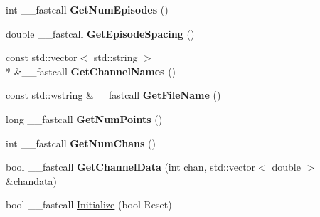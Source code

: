 \begin{DoxyCompactItemize}
\item 
\hypertarget{class_t_playback_waveform_ad7a57b795e3c7b2c9f4f48e43db97c0c}{int \+\_\+\+\_\+fastcall {\bfseries Get\+Num\+Episodes} ()}\label{class_t_playback_waveform_ad7a57b795e3c7b2c9f4f48e43db97c0c}

\item 
\hypertarget{class_t_playback_waveform_ae42334d0a3445961bb4142ee0c5bd1e8}{double \+\_\+\+\_\+fastcall {\bfseries Get\+Episode\+Spacing} ()}\label{class_t_playback_waveform_ae42334d0a3445961bb4142ee0c5bd1e8}

\item 
\hypertarget{class_t_playback_waveform_aef1419913b7306a5e8d7085d20357531}{const std\+::vector$<$ std\+::string $>$\\*
 \&\+\_\+\+\_\+fastcall {\bfseries Get\+Channel\+Names} ()}\label{class_t_playback_waveform_aef1419913b7306a5e8d7085d20357531}

\item 
\hypertarget{class_t_playback_waveform_af5c6e558e8067717a6471d1fe99f407f}{const std\+::wstring \&\+\_\+\+\_\+fastcall {\bfseries Get\+File\+Name} ()}\label{class_t_playback_waveform_af5c6e558e8067717a6471d1fe99f407f}

\item 
\hypertarget{class_t_playback_waveform_aea3464377aa910def8d269b4e9bd9aef}{long \+\_\+\+\_\+fastcall {\bfseries Get\+Num\+Points} ()}\label{class_t_playback_waveform_aea3464377aa910def8d269b4e9bd9aef}

\item 
\hypertarget{class_t_playback_waveform_ad2464d9af56c3658a07b98d7de93d33f}{int \+\_\+\+\_\+fastcall {\bfseries Get\+Num\+Chans} ()}\label{class_t_playback_waveform_ad2464d9af56c3658a07b98d7de93d33f}

\item 
\hypertarget{class_t_playback_waveform_ae85f6e9771b93bbdc6f1a667520ace3d}{bool \+\_\+\+\_\+fastcall {\bfseries Get\+Channel\+Data} (int chan, std\+::vector$<$ double $>$ \&chandata)}\label{class_t_playback_waveform_ae85f6e9771b93bbdc6f1a667520ace3d}

\item 
\hypertarget{class_t_playback_waveform_aa717d45b40b6e85e914f1e9fdcfbe5b9}{bool \+\_\+\+\_\+fastcall \hyperlink{class_t_playback_waveform_aa717d45b40b6e85e914f1e9fdcfbe5b9}{Initialize} (bool Reset)}\label{class_t_playback_waveform_aa717d45b40b6e85e914f1e9fdcfbe5b9}


\end{DoxyCompactItemize}
